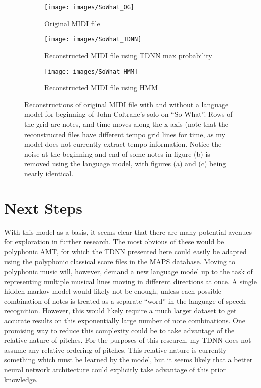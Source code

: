 \documentclass[conference]{IEEEtran}
\begin{document}
\begin{figure}[!t]
\centering
\begin{subfigure}[b]{0.45\textwidth}
   \texttt{[image: images/SoWhat\_OG]}
   \caption{Original MIDI file}
   \label{fig:Ng1} 
\end{subfigure}

\begin{subfigure}[b]{0.45\textwidth}
   \texttt{[image: images/SoWhat\_TDNN]}
   \caption{Reconstructed MIDI file using TDNN max probability}
   \label{fig:Ng1} 
\end{subfigure}

\begin{subfigure}[b]{0.45\textwidth}
   \texttt{[image: images/SoWhat\_HMM]}
   \caption{Reconstructed MIDI file using HMM}
   \label{fig:Ng2}
\end{subfigure}

\caption{Reconstructions of original MIDI file with and without a language model for beginning of John Coltrane's solo on ``So What''. Rows of the grid are notes, and time moves along the x-axis (note that the reconstructed files have different tempo grid lines for time, as my model does not currently extract tempo information. Notice the noise at the beginning and end of some notes in figure (b) is removed using the language model, with figures (a) and (c) being nearly identical.}

\label{fig:midipics}
\end{figure}


\section{Next Steps}

With this model as a basis, it seems clear that there are many potential avenues for exploration in further research. The most obvious of these would be polyphonic AMT, for which the TDNN presented here could easily be adapted using the polyphonic classical score files in the MAPS database. Moving to polyphonic music will, however, demand a new language model up to the task of representing multiple musical lines moving in different directions at once. A single hidden markov model would likely not be enough, unless each possible combination of notes is treated as a separate ``word'' in the language of speech recognition. However, this would likely require a much larger dataset to get accurate results on this exponentially large number of note combinations. One promising way to reduce this complexity could be to take advantage of the relative nature of pitches. For the purposes of this research, my TDNN does not assume any relative ordering of pitches. This relative nature is currently something which must be learned by the model, but it seems likely that a better neural network architecture could explicitly take advantage of this prior knowledge.
\end{document}
